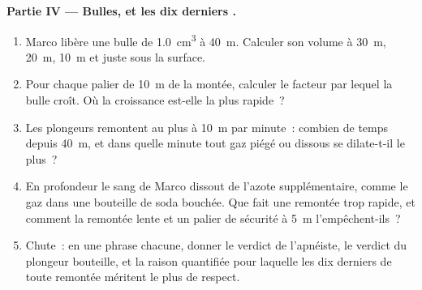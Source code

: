 \begin{problem}
\medskip
\noindent\textbf{Partie IV --- Bulles, et les dix derniers
.}
\begin{enumerate}[resume]
  \item Marco libère une bulle de \qty{1.0}{cm^3} à \qty{40}{m}.
        Calculer son volume à \qty{30}{m}, \qty{20}{m}, \qty{10}{m} et
        juste sous la surface.
  \item Pour chaque palier de \qty{10}{m} de la montée, calculer le
        facteur par lequel la bulle croît. Où la croissance est-elle
        la plus rapide~?
  \item Les plongeurs remontent au plus à \qty{10}{m} par minute~:
        combien de temps depuis \qty{40}{m}, et dans quelle minute tout
        gaz piégé ou dissous se dilate-t-il le plus~?
  \item En profondeur le sang de Marco dissout de l'azote
        supplémentaire, comme le gaz dans une bouteille de soda
        bouchée. Que fait une remontée trop rapide, et comment la
        remontée lente et un palier de sécurité à \qty{5}{m}
        l'empêchent-ils~?
  \item Chute~: en une phrase chacune, donner le verdict de
        l'apnéiste, le verdict du plongeur bouteille, et la raison
        quantifiée pour laquelle les dix derniers
         de toute remontée méritent le plus de
        respect.
\end{enumerate}
\end{problem}
